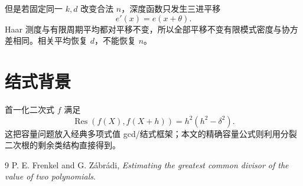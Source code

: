 \documentclass[11pt,a4paper]{ctexart}
\begin{document}
但是若固定同一 \(k,d\) 改变合法 \(n\)，深度函数只发生三进平移
\[
e'(x)=e(x+\theta).
\]
Haar 测度与有限周期平均都对平移不变，所以全部平移不变有限模式密度与协方差相同。相关平均恢复 \(d\)，不能恢复 \(n\)。

\section{结式背景}
首一化二次式 \(f\) 满足
\[
\operatorname{Res}(f(X),f(X+h))
=
h^2(h^2-\delta^2).
\]
这把容量问题放入经典多项式值 gcd/结式框架；本文的精确容量公式则利用分裂二次根的剩余类结构直接得到。

\begin{thebibliography}{9}
 P. E. Frenkel and G. Zábrádi, \emph{Estimating the greatest common divisor of the value of two polynomials}.
\end{thebibliography}
\end{document}
